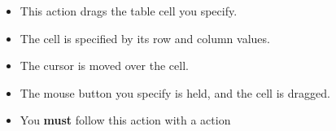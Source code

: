 
\begin{itemize}
\item This action drags the table cell you specify.
\item The cell is specified by its row and column values.
\item The cursor is moved over the cell.
\item The mouse button you specify is held, and the cell is dragged. 
\item You \textbf{must} follow this action with a  action
\end{itemize}

